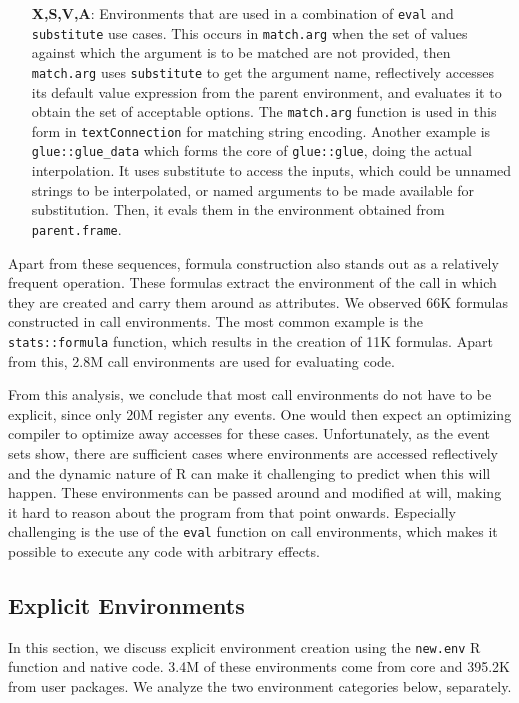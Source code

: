 \documentclass[10pt,review,sigplan,authorversion=true]{acmart}
\newcommand{\code}[1]{\lstinline |#1|\xspace}
\renewcommand{\c}[1]{\lstinline |#1|\xspace}
\newcommand{\newEnv}{\code{new.env}}
\newcommand{\eval}{\code{eval}}
\newcommand{\substitute}{\code{substitute}}
\begin{document}
\begin{itemize}
\item[{\bf X,S,V,A}:] Environments that are used in a combination of \eval and
  \substitute use cases. This occurs in \c{match.arg} when the set of values
  against which the argument is to be matched are not provided, then
  \c{match.arg} uses \c{substitute} to get the argument name, reflectively
  accesses its default value expression from the parent environment, and
  evaluates it to obtain the set of acceptable options. The \c{match.arg}
  function is used in this form in \c{textConnection} for matching string
  encoding. Another example is \c{glue::glue_data} which forms the core of
  \c{glue::glue}, doing the actual interpolation. It uses substitute to access
  the inputs, which could be unnamed strings to be interpolated, or named
  arguments to be made available for substitution. Then, it evals them in the
  environment obtained from \c{parent.frame}.

\end{itemize}

Apart from these sequences, formula construction also stands out as a relatively
frequent operation. These formulas extract the environment of the call in which
they are created and carry them around as attributes. We observed 66K formulas
constructed in call environments. The most common example is the
\c{stats::formula} function, which results in the creation of 11K formulas.
Apart from this, 2.8M call environments are used for evaluating code.

From this analysis, we conclude that most call environments do not have to be
explicit, since only 20M register any events. One would then expect an
optimizing compiler to optimize away accesses for these cases. Unfortunately, as
the event sets show, there are sufficient cases where environments are accessed
reflectively and the dynamic nature of R can make it challenging to predict when
this will happen. These environments can be passed around and modified at will,
making it hard to reason about the program from that point onwards. Especially
challenging is the use of the \c{eval} function on call environments, which
makes it possible to execute any code with arbitrary effects.

\subsection{Explicit Environments}
In this section, we discuss explicit environment creation using the \newEnv R
function and native code. 3.4M of these environments come from core and 395.2K
from user packages. We analyze the two environment categories below, separately.
\end{document}
